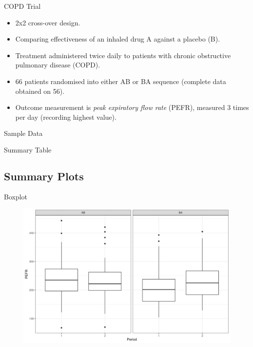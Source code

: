 \documentclass{beamer}
\begin{document}
\begin{frame}{COPD Trial}
    \begin{itemize}
        \item 2x2 cross-over design.
        \item Comparing effectiveness of an inhaled drug A against a placebo (B).
        \item Treatment administered twice daily to patients with chronic obstructive pulmonary disease (COPD).
        \item 66 patients randomised into either AB or BA sequence (complete data obtained on 56).
        \item Outcome measurement is \textit{peak expiratory flow rate} (PEFR), measured 3 times per day (recording highest value).
    \end{itemize}
\end{frame}

\begin{frame}{Sample Data}
    
\end{frame}

\begin{frame}{Summary Table}
    
\end{frame}

\subsection{Summary Plots}

\begin{frame}{Boxplot}
    \begin{figure}
    \centering
    \includegraphics[width=\linewidth]{report/figures/ch2/boxplot.png}
\end{figure}
\end{frame}
\end{document}
